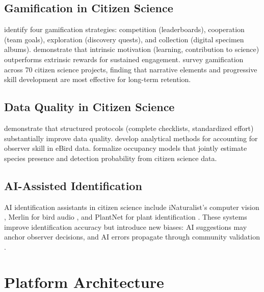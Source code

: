 \documentclass[11pt,a4paper]{article}
\begin{document}
\subsection{Gamification in Citizen Science}

\citet{bowser2013gamifying} identify four gamification strategies:
competition (leaderboards), cooperation (team goals), exploration
(discovery quests), and collection (digital specimen albums).
\citet{eveleigh2014designing} demonstrate that intrinsic motivation
(learning, contribution to science) outperforms extrinsic rewards for
sustained engagement. \citet{preece2019citizen} survey
gamification across 70 citizen science projects, finding that narrative
elements and progressive skill development are most effective for
long-term retention.

\subsection{Data Quality in Citizen Science}

\citet{kelling2015can} demonstrate that structured protocols (complete
checklists, standardized effort) substantially improve data quality.
\citet{johnston2020analytical} develop analytical methods for
accounting for observer skill in eBird data. \citet{isaac2014statistics}
formalize occupancy models that jointly estimate species presence
and detection probability from citizen science data.

\subsection{AI-Assisted Identification}

AI identification assistants in citizen science include iNaturalist's
computer vision \citep{van2021benchmarking}, Merlin for bird audio
\citep{kahl2021birdnet}, and PlantNet for plant identification
\citep{goeau2022overview}. These systems improve identification accuracy
but introduce new biases: AI suggestions may anchor observer decisions,
and AI errors propagate through community validation
\citep{terry2020think}.


\section{Platform Architecture}
\label{sec:architecture}
\end{document}
